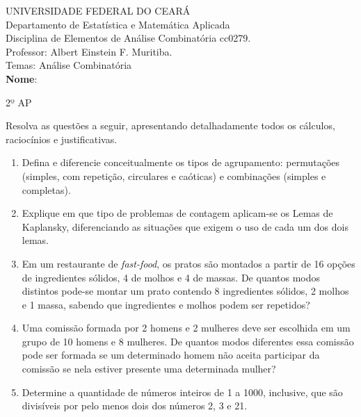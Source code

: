 \documentclass[a4paper,12pt]{letter}  %
\begin{document}
\thispagestyle{empty}

UNIVERSIDADE FEDERAL DO CEARÁ\\
Departamento de Estatística e Matemática Aplicada\\
Disciplina de Elementos de Análise Combinatória cc0279.\\
Professor: Albert Einstein F. Muritiba.\\
Temas: Análise Combinatória\\[0.2cm]
\textbf{Nome}: \makebox[380pt]{\hrulefill} \vspace{2pt}
\begin{center}
	2º AP
\end{center}
Resolva as questões a seguir, apresentando detalhadamente todos os cálculos, raciocínios e justificativas.
\begin{enumerate}
    \item Defina e diferencie conceitualmente os tipos de agrupamento: permutações (simples, com repetição, circulares e caóticas) e combinações (simples e completas).
	\item Explique em que tipo de problemas de contagem aplicam-se os Lemas de Kaplansky, diferenciando as situações que exigem o uso de cada um dos dois lemas.
	\item Em um restaurante de \textit{fast-food}, os pratos são montados a partir de 16 opções de ingredientes sólidos, 4 de molhos e 4 de massas. De quantos modos distintos pode-se montar um prato contendo 8 ingredientes sólidos, 2 molhos e 1 massa, sabendo que ingredientes e molhos podem ser repetidos?
	
    \item Uma comissão formada por 2 homens e 2 mulheres deve ser escolhida em um grupo de 10 homens e 8 mulheres. De quantos modos diferentes essa comissão pode ser formada se um determinado homem não aceita participar da comissão se nela estiver presente uma determinada mulher?
    
    \item Determine a quantidade de números inteiros de 1 a 1000, inclusive, que são divisíveis por pelo menos dois dos números 2, 3 e 21.


           
\end{enumerate}
\end{document}
